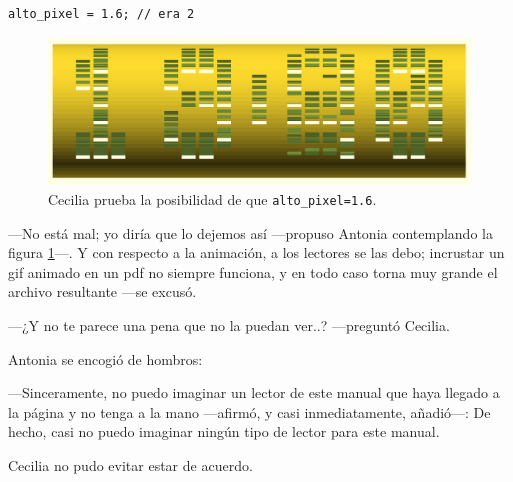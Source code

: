 \begin{lstlisting}[numbers=none]
alto_pixel = 1.6; // era 2
\end{lstlisting}%

\begin{figure}[ht]
  \centering
  \includegraphics[width=.8\textwidth]{imagenes/13_40_1_6}  
  \caption{Cecilia prueba la posibilidad de que
    \texttt{alto\_pixel=1.6}.}
  \label{fig:13_40_1_6}
\end{figure}


---No está mal; yo diría que lo dejemos así ---propuso An\-to\-nia
contemplando la figura \ref{fig:13_40_1_6}---. Y con respecto a la
animación, a los lectores se las debo; incrustar un gif animado en un
pdf no siempre funciona, y en todo caso torna muy grande el archivo
resultante ---se excusó.

---¿Y no te parece una pena que no la puedan ver..?  ---pre\-gun\-tó
Cecilia.

Antonia se encogió de hombros:

---Sinceramente, no puedo imaginar un lector de este manual que haya
llegado a la página \thepage{} y no tenga \openscad{} a la mano
---a\-fir\-mó, y casi inmediatamente, añadió---: De hecho, casi no
puedo imaginar ningún tipo de lector para este manual.

Cecilia no pudo evitar estar de acuerdo.


